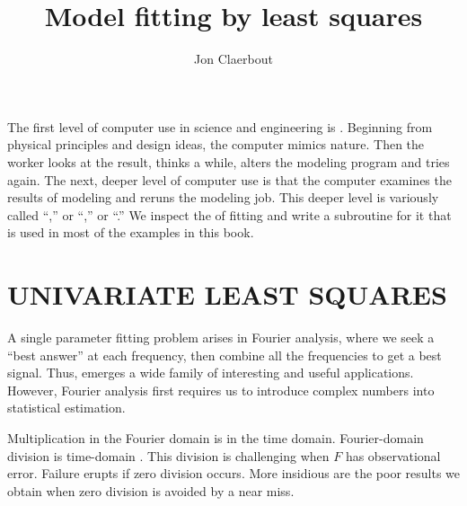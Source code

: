 
\title{Model fitting by least squares}
\author{Jon Claerbout}

\maketitle

\label{paper:lsq}

\def\ff{{\bf f}}
\def\dd{{\bf d}}

\par
The first level of computer use in science and engineering is .
Beginning from physical principles and design ideas,
the computer mimics nature.
Then the worker looks at the result, thinks a while,
alters the modeling program and tries again.
The next, deeper level of computer use is that the computer 
examines the results of modeling and reruns the modeling job.
This deeper level
is variously called
``,'' or
``,'' or
``.''
We inspect the  of fitting
and write a subroutine for it that is used in most of
the examples in this book.

\section{UNIVARIATE LEAST SQUARES}
A single parameter fitting problem arises in Fourier analysis,
where we seek a ``best answer'' at each frequency,
then combine all the frequencies to get a best signal.
Thus, emerges a wide family of interesting and useful applications.
However, Fourier analysis first requires us to introduce complex numbers
into statistical estimation.
\par
Multiplication in the Fourier domain is  in the time domain.
Fourier-domain division is time-domain .
This division is challenging when $F$ has observational error.
Failure erupts if zero division occurs.
More insidious are the poor results we obtain
when zero division is avoided by a near miss.

